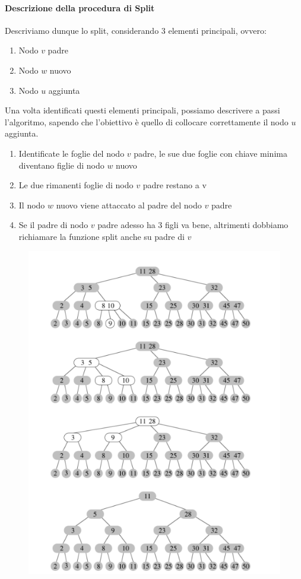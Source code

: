 \documentclass{article}
\begin{document}
\paragraph{Descrizione della procedura di Split}

Descriviamo dunque lo split, considerando 3 elementi principali, ovvero:
\begin{enumerate}
    \item Nodo $v$ padre
    \item Nodo $w$ nuovo
    \item Nodo $u$ aggiunta
\end{enumerate}

Una volta identificati questi elementi principali, possiamo descrivere a passi l'algoritmo, sapendo che l'obiettivo è quello di collocare correttamente il nodo $u$ aggiunta.

\begin{enumerate}
    \item Identificate le foglie del nodo $v$ padre, le sue due foglie con chiave minima diventano figlie di nodo $w$ nuovo
    \item Le due rimanenti foglie di nodo $v$ padre restano a v
    \item Il nodo $w$ nuovo viene attaccato al padre del nodo $v$ padre
    \item Se il padre di nodo $v$ padre adesso ha 3 figli va bene, altrimenti dobbiamo richiamare la funzione split anche su padre di $v$
\end{enumerate}
\begin{figure}[htbp]
        \center
        \includegraphics[scale=0.5]{img/imgSplit23.png}
\end{figure}
\newpage
\end{document}
